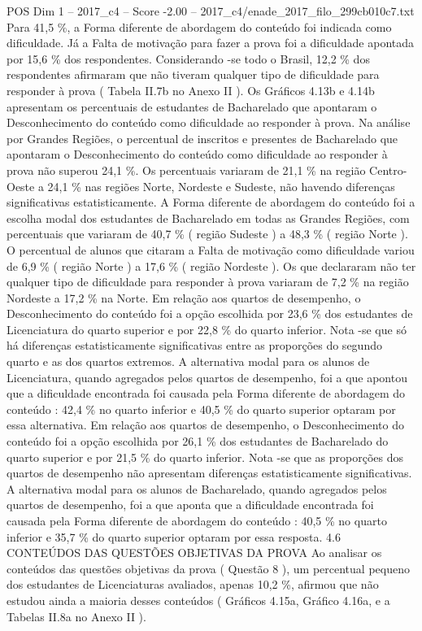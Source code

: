 \begin{textsample}{POS Dim 1 – 2017\_c4 – Score -2.00 – 2017\_c4/enade\_2017\_filo\_299cb010c7.txt}
Para 41,5 \%, a Forma diferente de abordagem do conteúdo foi indicada como dificuldade.
Já a Falta de motivação para fazer a prova foi a dificuldade apontada por 15,6 \% dos respondentes.
Considerando -se todo o Brasil, 12,2 \% dos respondentes afirmaram que não tiveram qualquer tipo de dificuldade para responder à prova ( Tabela II.7b no Anexo II ).
Os Gráficos 4.13b e 4.14b apresentam os percentuais de estudantes de Bacharelado que apontaram o Desconhecimento do conteúdo como dificuldade ao responder à prova.
Na análise por Grandes Regiões, o percentual de inscritos e presentes de Bacharelado que apontaram o Desconhecimento do conteúdo como dificuldade ao responder à prova não superou 24,1 \%.
Os percentuais variaram de 21,1 \% na região Centro-Oeste a 24,1 \% nas regiões Norte, Nordeste e Sudeste, não havendo diferenças significativas estatisticamente.
A Forma diferente de abordagem do conteúdo foi a escolha modal dos estudantes de Bacharelado em todas as Grandes Regiões, com percentuais que variaram de 40,7 \% ( região Sudeste ) a 48,3 \% ( região Norte ).
O percentual de alunos que citaram a Falta de motivação como dificuldade variou de 6,9 \% ( região Norte ) a 17,6 \% ( região Nordeste ).
Os que declararam não ter qualquer tipo de dificuldade para responder à prova variaram de 7,2 \% na região Nordeste a 17,2 \% na Norte.
Em relação aos quartos de desempenho, o Desconhecimento do conteúdo foi a opção escolhida por 23,6 \% dos estudantes de Licenciatura do quarto superior e por 22,8 \% do quarto inferior.
Nota -se que só há diferenças estatisticamente significativas entre as proporções do segundo quarto e as dos quartos extremos.
A alternativa modal para os alunos de Licenciatura, quando agregados pelos quartos de desempenho, foi a que apontou que a dificuldade encontrada foi causada pela Forma diferente de abordagem do conteúdo : 42,4 \% no quarto inferior e 40,5 \% do quarto superior optaram por essa alternativa.
Em relação aos quartos de desempenho, o Desconhecimento do conteúdo foi a opção escolhida por 26,1 \% dos estudantes de Bacharelado do quarto superior e por 21,5 \% do quarto inferior.
Nota -se que as proporções dos quartos de desempenho não apresentam diferenças estatisticamente significativas.
A alternativa modal para os alunos de Bacharelado, quando agregados pelos quartos de desempenho, foi a que aponta que a dificuldade encontrada foi causada pela Forma diferente de abordagem do conteúdo : 40,5 \% no quarto inferior e 35,7 \% do quarto superior optaram por essa resposta. 4.6 CONTEÚDOS DAS QUESTÕES OBJETIVAS DA PROVA Ao analisar os conteúdos das questões objetivas da prova ( Questão 8 ), um percentual pequeno dos estudantes de Licenciaturas avaliados, apenas 10,2 \%, afirmou que não estudou ainda a maioria desses conteúdos ( Gráficos 4.15a, Gráfico 4.16a, e a Tabelas II.8a no Anexo II ).

\end{textsample}

